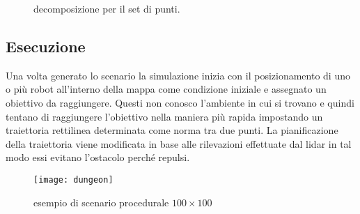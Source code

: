 \begin{figure}[!htb]
\centering
    \resizebox{0.7\linewidth}{!}{}
\caption{decomposizione per il set di punti.}
\label{fig:decomposizione}
\end{figure}

\subsection{Esecuzione}
Una volta generato lo scenario la simulazione inizia con il posizionamento di uno o più robot all'interno della mappa come condizione iniziale e assegnato un obiettivo da raggiungere.
Questi non conosco l'ambiente in cui si trovano e quindi tentano di raggiungere l'obiettivo nella maniera più rapida impostando un traiettoria rettilinea determinata come norma tra due punti. La pianificazione della traiettoria viene modificata in base alle rilevazioni effettuate dal lidar in tal modo essi evitano l'ostacolo perché repulsi.

\begin{figure}[!htb]
\centering
\texttt{[image: dungeon]}
\caption{esempio di scenario procedurale $100\times100$}
\label{fig:dungeon}
\end{figure}